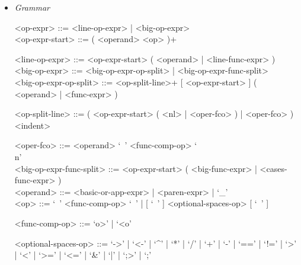 \documentclass{article}
\begin{document}
\begin{itemize}
\begin{verbatim}
"Hello, I'm a big string that's going to contain multiple values from " +
"inside the imaginary program that I'm a part of. Here they are:\n" +
"value1 = " + value1 + ", value2 = " + value2 + ", value3 = " + value3 +
", value4 = " + value4 + ", value5 = " + value5
\end{verbatim}

\textbf{Description}

It is possible to stretch a (big) operator expression over multiple lines.
In that case:
\begin{itemize}
\item
The operator expression must split in a new line after an operator (not an
argument).

\item
Every line after the first must be indented so that in begins at the column
where the first line of the operator expression begun.

\item
The precise indentation rules are described in the section
"Indentation System" \ref{subsubsec:indsys}.
\end{itemize}

\item \textit{Grammar}
\begin{grammar}
<op-expr> ::= <line-op-expr> | <big-op-expr>
\\

<op-expr-start> ::= ( <operand> <op> )+

<line-op-expr> ::= <op-expr-start> ( <operand> | <line-func-expr> )
\\

<big-op-expr> ::=
<big-op-expr-op-split> | <big-op-expr-func-split>
\\

<big-op-expr-op-split> ::=
<op-split-line>+ [ <op-expr-start> ] ( <operand> | <func-expr> )

<op-split-line> ::=
( <op-expr-start> ( <nl> | <oper-fco> ) | <oper-fco> ) <indent>

<oper-fco> ::= <operand> `\ ' <func-comp-op> `\\n'
\\

<big-op-expr-func-split> ::=
<op-expr-start> ( <big-func-expr> | <cases-func-expr> )
\\

<operand> ::= <basic-or-app-expr> | <paren-expr> | `_'
\\

<op> ::= `\ ' <func-comp-op> `\ ' | [ `\ ' ] <optional-spaces-op> [ `\ ' ]

<func-comp-op> ::= `o>' | `<o'

<optional-spaces-op> ::=
`->' | `<-' | `^' | `*' | `/' | `+' | `-' | `==' | `!=' | `>' | `<' | `>=' |
`<=' | `\&' | `|' | `;>' | `;'
\end{grammar}
\end{itemize}
\end{document}
